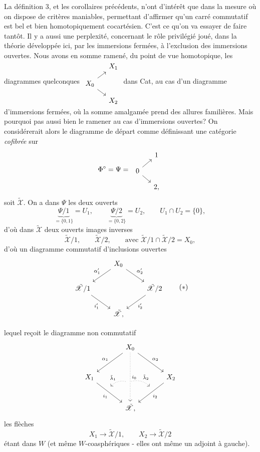 \documentclass[11pt]{article}
\newcommand{\printedpage}[1]{\marginpar{\footnotesize p.~#1}}
\newcommand{\msp}[1]{\marginpar{\footnotesize [#1]}}
\newcommand{\tX}{\tilde{\mathscr{X}}}
\begin{document}
La définition 3, et les corollaires précédents, n'ont d'intérêt que dans la mesure où on dispose de critères maniables, permettant d'affirmer qu'un carré commutatif est bel et bien homotopiquement cocartésien. C'est ce qu'on va essayer de faire tantôt. Il y a aussi une perplexité, concernant le rôle privilégié joué, dans la théorie développée ici, par les immersions fermées, à l'exclusion des immersions ouvertes. Nous avons en somme ramené, du
\printedpage{91}
\msp{page 134}
point de vue homotopique, les diagrammes quelconques $\begin{tikzcd}[row sep=small, column sep=small]
 & X_1 \\
X_0 \arrow[ur] \arrow[dr] & \\
 & X_2
\end{tikzcd}$ dans Cat, au cas d'un diagramme d'immersions fermées, où la somme amalgamée prend des allures familières. Mais pourquoi pas aussi bien le ramener au cas d'immersions ouvertes? On considérerait alors le diagramme de départ comme définissant une catégorie \textit{cofibrée} sur
\[
\Phi^{\circ} = \Psi = \
\begin{tikzcd}[row sep=small, column sep=small]
 & 1 \\
0 \arrow[ur] \arrow[dr] & \\
 & 2,
\end{tikzcd}
\]
soit $\tX$. On a dans $\Psi$ les deux ouverts
\[
\underbrace{\Psi/1}_{=\{0,1\}} = U_1, \qquad \underbrace{\Psi/2}_{=\{0,2\}} = U_2, \qquad U_1 \cap U_2 = \{0\},
\]
d'où dans $\tX$ deux ouverts images inverses
\[
\tX/1, \qquad \tX/2, \qquad \text{avec } \tX/1 \cap \tX/2 = X_0,
\]
d'où un diagramme commutatif d'inclusions ouvertes
\[
\begin{tikzcd}
 & X_0 \arrow[dl, "\alpha'_1"'] \arrow[dr, "\alpha'_2"] & \\
\tX/1 \arrow[dr, "i'_1"'] & & \tX/2 \arrow[dl, "i'_2"] \\
 & \tX, &
\end{tikzcd}
\tag*{$(*)$}
\]

\msp{page 135}
lequel reçoit le diagramme non commutatif
\[
\begin{tikzcd}[row sep=large, column sep=large]
 & X_0 \arrow[dl, "\alpha_1"'] \arrow[dr, "\alpha_2"] \arrow[dd, dotted, "i_0", ""'{name=J0, pos=0.6}] & \\
X_1 \arrow[dr, "i_1"', ""{name=J1, pos=0.4}] & & X_2 \arrow[dl, "i_2", ""'{name=J2, pos=0.4}] \\
 & \tX, &
\arrow[from=J0, to=J1, dotted, bend right, "\tilde{\lambda}_1"', shorten <=2pt, shorten >=2pt]
\arrow[from=J0, to=J2, dotted, bend left, "\tilde{\lambda}_2", shorten <=2pt, shorten >=2pt]
\end{tikzcd}
\]
\printedpage{92}
les flèches
\[
X_1 \longrightarrow \tX/1, \qquad X_2 \longrightarrow \tX/2
\]
étant dans $W$ (et même $W$-coasphériques - elles ont même un adjoint à gauche).
\end{document}
